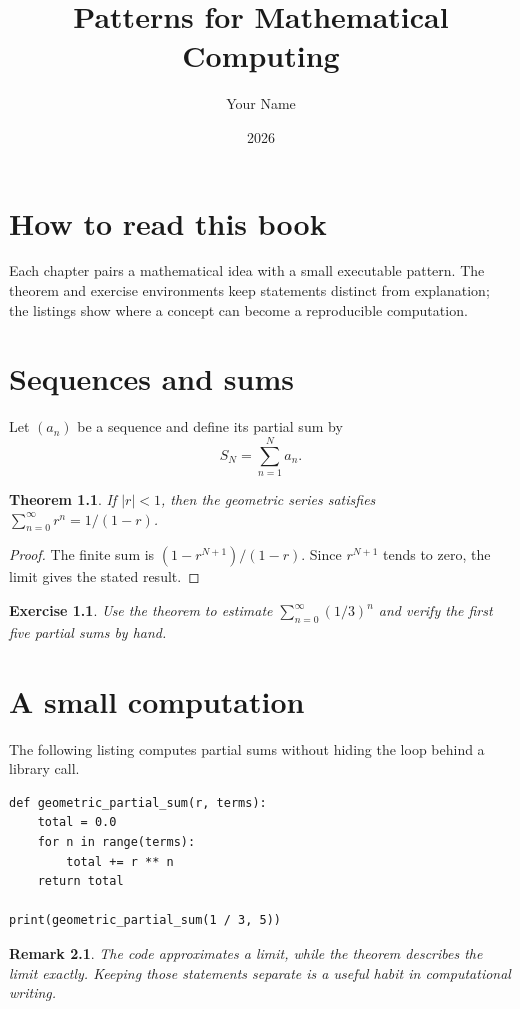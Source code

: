 \documentclass[11pt]{book}
\title{Patterns for Mathematical Computing}
\author{Your Name}
\date{2026}
\newtheorem{theorem}{Theorem}[chapter]
\newtheorem{exercise}{Exercise}[chapter]
\newtheorem{remark}{Remark}[chapter]
\begin{document}
\frontmatter
\maketitle
\chapter*{How to read this book}
Each chapter pairs a mathematical idea with a small executable pattern. The
theorem and exercise environments keep statements distinct from explanation;
the listings show where a concept can become a reproducible computation.
\tableofcontents
\mainmatter
\chapter{Sequences and sums}
Let $(a_n)$ be a sequence and define its partial sum by
\begin{equation}
  S_N=\sum_{n=1}^{N}a_n.
\end{equation}
\begin{theorem}
If $|r|<1$, then the geometric series satisfies
$\sum_{n=0}^{\infty}r^n=1/(1-r)$.
\end{theorem}
\begin{proof}
The finite sum is $(1-r^{N+1})/(1-r)$. Since $r^{N+1}$ tends to zero, the
limit gives the stated result.
\end{proof}
\begin{exercise}
Use the theorem to estimate $\sum_{n=0}^{\infty}(1/3)^n$ and verify the first
five partial sums by hand.
\end{exercise}
\chapter{A small computation}
The following listing computes partial sums without hiding the loop behind a
library call.
\begin{lstlisting}
def geometric_partial_sum(r, terms):
    total = 0.0
    for n in range(terms):
        total += r ** n
    return total

print(geometric_partial_sum(1 / 3, 5))
\end{lstlisting}
\begin{remark}
The code approximates a limit, while the theorem describes the limit exactly.
Keeping those statements separate is a useful habit in computational writing.
\end{remark}
\end{document}
